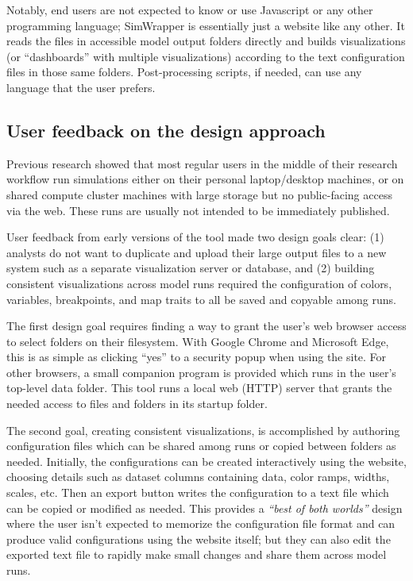 \documentclass[3p,times,procedia]{elsarticle}
\begin{document}
Notably, end users are not expected to know or use Javascript or any other programming language; SimWrapper is essentially just a website like any other. It reads the files in accessible model output folders directly and builds visualizations (or “dashboards” with multiple visualizations) according to the text configuration files in those same folders. Post-processing scripts, if needed, can use any language that the user prefers.

\subsection{User feedback on the design approach}

Previous research showed that most regular users in the middle of their research workflow run simulations either on their personal laptop/desktop machines, or on shared compute cluster machines with large storage but no public-facing access via the web. These runs are usually not intended to be immediately published.

User feedback from early versions of the tool made two design goals clear: (1) analysts do not want to duplicate and upload their large output files to a new system such as a separate visualization server or database, and (2) building consistent visualizations across model runs required the configuration of colors, variables, breakpoints, and map traits to all be saved and copyable among runs.

The first design goal requires finding a way to grant the user's web browser access to select folders on their filesystem. With Google Chrome and Microsoft Edge, this is as simple as clicking “yes” to a security popup when using the site. For other browsers, a small companion program is provided which runs in the user's top-level data folder. This tool runs a local web (HTTP) server that grants the needed access to files and folders in its startup folder.

The second goal, creating consistent visualizations, is accomplished by authoring configuration files which can be shared among runs or copied between folders as needed. Initially, the configurations can be created interactively using the website, choosing details such as dataset columns containing data, color ramps, widths, scales, etc. Then an export button writes the configuration to a text file which can be copied or modified as needed. This provides
a \textit{``best of both worlds''} design where the user isn't expected to memorize the configuration file format and can produce valid configurations using the website itself; but they can also edit the exported text file to rapidly make small changes and share them across model runs.
\end{document}
